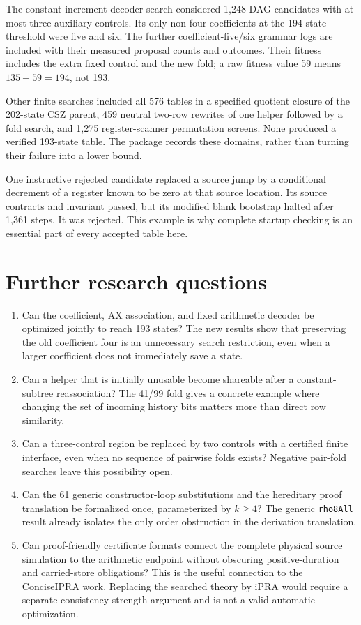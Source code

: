 \documentclass[10pt,letterpaper]{article}
\newcommand{\file}[1]{\nolinkurl{#1}}
\begin{document}
The constant-increment decoder search considered 1,248 DAG candidates with at most three auxiliary controls. Its only non-four coefficients at the 194-state threshold were five and six. The further coefficient-five/six grammar logs are included with their measured proposal counts and outcomes. Their fitness includes the extra fixed control and the new fold; a raw fitness value 59 means $135+59=194$, not 193.

Other finite searches included all 576 tables in a specified quotient closure of the 202-state CSZ parent, 459 neutral two-row rewrites of one helper followed by a fold search, and 1,275 register-scanner permutation screens. None produced a verified 193-state table. The package records these domains, rather than turning their failure into a lower bound.

One instructive rejected candidate replaced a source jump by a conditional decrement of a register known to be zero at that source location. Its source contracts and invariant passed, but its modified blank bootstrap halted after 1,361 steps. It was rejected. This example is why complete startup checking is an essential part of every accepted table here.

\section{Further research questions}

\begin{enumerate}
\item Can the coefficient, AX association, and fixed arithmetic decoder be optimized jointly to reach 193 states? The new results show that preserving the old coefficient four is an unnecessary search restriction, even when a larger coefficient does not immediately save a state.
\item Can a helper that is initially unusable become shareable after a constant-subtree reassociation? The 41/99 fold gives a concrete example where changing the set of incoming history bits matters more than direct row similarity.
\item Can a three-control region be replaced by two controls with a certified finite interface, even when no sequence of pairwise folds exists? Negative pair-fold searches leave this possibility open.
\item Can the 61 generic constructor-loop substitutions and the hereditary proof translation be formalized once, parameterized by $k\ge4$? The generic \file{rho8All} result already isolates the only order obstruction in the derivation translation.
\item Can proof-friendly certificate formats connect the complete physical source simulation to the arithmetic endpoint without obscuring positive-duration and carried-store obligations? This is the useful connection to the ConciseIPRA work. Replacing the searched theory by iPRA would require a separate consistency-strength argument and is not a valid automatic optimization.
\end{enumerate}
\end{document}
